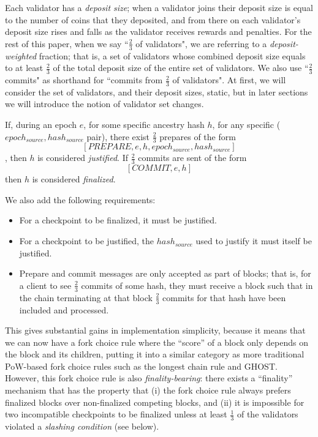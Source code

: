\documentclass[12pt]{article}
\begin{document}
Each validator has a \textit{deposit size}; when a validator joins their deposit size is equal to the number of coins that they deposited, and from there on each validator's deposit size rises and falls as the validator receives rewards and penalties. For the rest of this paper, when we say ``$\frac{2}{3}$ of validators", we are referring to a \textit{deposit-weighted} fraction; that is, a set of validators whose combined deposit size equals to at least $\frac{2}{3}$ of the total deposit size of the entire set of validators. We also use ``$\frac{2}{3}$ commits" as shorthand for ``commits from $\frac{2}{3}$ of validators". At first, we will consider the set of validators, and their deposit sizes, static, but in later sections we will introduce the notion of validator set changes.

If, during an epoch $e$, for some specific ancestry hash $h$, for any specific ($epoch_{source}, hash_{source}$ pair), there exist $\frac{2}{3}$ prepares of the form $$[PREPARE, e, h, epoch_{source}, hash_{source}]$$, then $h$ is considered \textit{justified}. If $\frac{2}{3}$ commits are sent of the form $$[COMMIT, e, h]$$ then $h$ is considered \textit{finalized}.

We also add the following requirements:

\begin{itemize}
\item For a checkpoint to be finalized, it must be justified.
\item For a checkpoint to be justified, the $hash_{source}$ used to justify it must itself be justified.
\item Prepare and commit messages are only accepted as part of blocks; that is, for a client to see $\frac{2}{3}$ commits of some hash, they must receive a block such that in the chain terminating at that block $\frac{2}{3}$ commits for that hash have been included and processed.
\end{itemize}

This gives substantial gains in implementation simplicity, because it means that we can now have a fork choice rule where the ``score'' of a block only depends on the block and its children, putting it into a similar category as more traditional PoW-based fork choice rules such as the longest chain rule and GHOST. However, this fork choice rule is also \textit{finality-bearing}: there exists a ``finality'' mechanism that has the property that (i) the fork choice rule always prefers finalized blocks over non-finalized competing blocks, and (ii) it is impossible for two incompatible checkpoints to be finalized unless at least $\frac{1}{3}$ of the validators violated a \textit{slashing condition} (see below).
\end{document}
